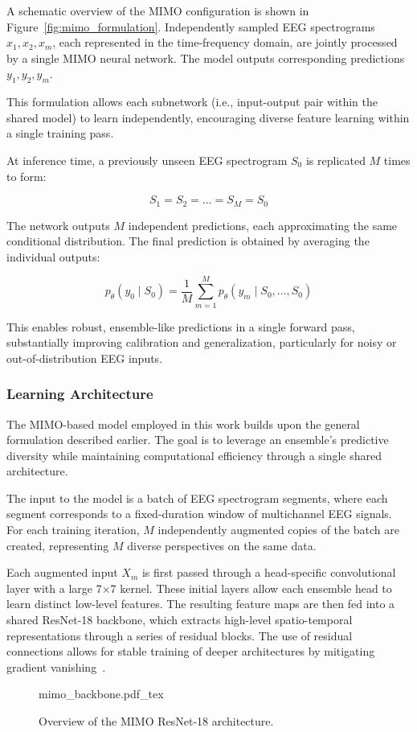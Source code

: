 A schematic overview of the MIMO configuration is shown in Figure~\ref{fig:mimo_formulation}. Independently sampled EEG spectrograms \( x_1, x_2, x_m \), each represented in the time-frequency domain, are jointly processed by a single MIMO neural network. The model outputs corresponding predictions \( y_1, y_2, y_m \).

This formulation allows each subnetwork (i.e., input-output pair within the shared model) to learn independently, encouraging diverse feature learning within a single training pass.

At inference time, a previously unseen EEG spectrogram \( S_0 \) is replicated \( M \) times to form:

\begin{equation}
S_1 = S_2 = \ldots = S_M = S_0
\end{equation}

The network outputs \( M \) independent predictions, each approximating the same conditional distribution. The final prediction is obtained by averaging the individual outputs:

\begin{equation}
p_{\theta}(y_0 \mid S_0) = \frac{1}{M} \sum_{m=1}^{M} p_{\theta}(y_m \mid S_0, \ldots, S_0)
\end{equation}

This enables robust, ensemble-like predictions in a single forward pass, substantially improving calibration and generalization, particularly for noisy or out-of-distribution EEG inputs.

\subsubsection{Learning Architecture}
The MIMO-based model employed in this work builds upon the general formulation described earlier. The goal is to leverage an ensemble's predictive diversity while maintaining computational efficiency through a single shared architecture.

The input to the model is a batch of EEG spectrogram segments, where each segment corresponds to a fixed-duration window of multichannel EEG signals. For each training iteration, $M$ independently augmented copies of the batch are created, representing $M$ diverse perspectives on the same data.

Each augmented input $X_m$ is first passed through a head-specific convolutional layer with a large 7×7 kernel. These initial layers allow each ensemble head to learn distinct low-level features. The resulting feature maps are then fed into a shared ResNet-18 backbone, which extracts high-level spatio-temporal representations through a series of residual blocks. The use of residual connections allows for stable training of deeper architectures by mitigating gradient vanishing~\cite{resnet}.
\begin{figure}[h!]
	\centering
    \def\svgwidth{130pt}
    \fontsize{8pt}{8pt}
 	{mimo_backbone.pdf_tex} 	 	
	\caption[MIMO Architecture Overview]{Overview of the MIMO ResNet-18 architecture.}
	\label{fig:mimo_architecture}
\end{figure}

